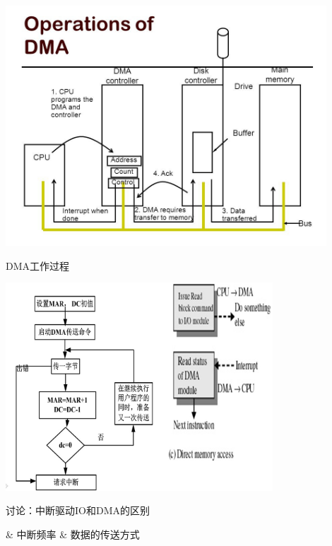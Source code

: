\begin{frame}
  \begin{center}
    \includegraphics[width=0.9\textwidth]{figure/DMA.jpg}
  \end{center}
\end{frame}

\begin{frame}[fragile]{DMA工作过程}
  \begin{center}
    \includegraphics[width=0.75\textwidth]{figure/dev-dma2.jpg}
  \end{center}
\end{frame}

\begin{frame}[fragile]{讨论：中断驱动IO和DMA的区别}
  \begin{easylist}
    & 中断频率
    & 数据的传送方式
  \end{easylist}
\end{frame}

